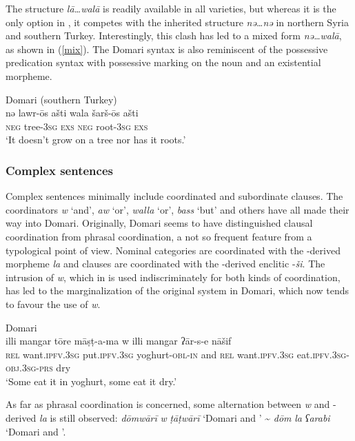 \documentclass[output=paper]{langsci/langscibook}
\begin{document}
The  structure \textit{lā…walā} is readily available in all varieties, but whereas it is the only option in , it competes with the inherited structure \textit{nə…nə} in northern Syria and southern Turkey. Interestingly, this clash has led to a mixed form \textit{nə…walā}, as shown in (\ref{mix}). The Domari syntax is also reminiscent of the  possessive predication syntax with possessive marking on the noun and an {existential} morpheme.

\ea \label{mix}
{ Domari (southern Turkey)}\\
\gll nə lawr-ōs ašti wala šarš-ōs ašti\\
     \textsc{neg} tree\textsc{-3sg} \textsc{exs} \textsc{neg} {root}\textsc{-3sg} \textsc{exs}\\
\glt ‘It doesn’t grow on a tree nor has it {roots}.’
\z


 \subsubsection{Complex sentences}

Complex sentences minimally include coordinated and subordinate clauses. The  coordinators \textit{w} ‘and’, \textit{aw} ‘or’, \textit{walla} ‘or’, \textit{bass} `but' and others have all made their way into Domari. Originally, Domari seems to have distinguished clausal {coordination} from phrasal {coordination}, a not so frequent feature from a typological point of view. Nominal categories are coordinated with the -derived morpheme \textit{la} and clauses are coordinated with the -derived enclitic -\textit{ši}. The intrusion of  \textit{w}, which in  is used indiscriminately for both kinds of {coordination}, has led to the marginalization of the original system in  Domari, which now tends to favour the use of  \textit{w}.

\ea
{ Domari}\\
\gll illi mangar tōre māṣṭ-a-ma w illi mangar ʔār-s-e nāšif\\
     \textsc{rel} want.\textsc{ipfv.3sg} put.\textsc{ipfv.3sg} yoghurt-\textsc{obl-in} and \textsc{rel} want.\textsc{ipfv.3sg} eat.\textsc{ipfv.3sg-obj.3sg-prs} dry\\
\glt ‘Some eat it in yoghurt, some eat it dry.’
\z

As far as phrasal {coordination} is concerned, some alternation between  \textit{w} and -derived \textit{la} is still observed: \textit{dōmwārī} \textit{w} \textit{ṭāṭwārī} ‘Domari and ’ {\textasciitilde} \textit{dōm} \textit{la} \textit{ʕarabi} ‘Domari and ’.
\end{document}
